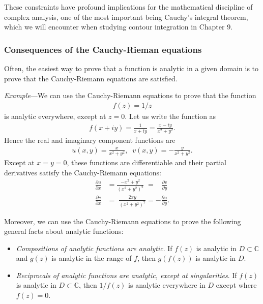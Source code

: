 \documentclass[10pt,a4paper]{article}
\begin{document}
\noindent
These constraints have profound implications for the mathematical
discipline of complex analysis, one of the most important being
Cauchy's integral theorem, which we will encounter when studying
contour integration in Chapter 9.

\subsubsection{Consequences of the Cauchy-Rieman equations}
\label{consequences-of-the-cauchy-riemann-equations}

Often, the easiest way to prove that a function is analytic in a given
domain is to prove that the Cauchy-Riemann equations are satisfied.

\begin{framed}\noindent
  \textit{Example}---We can use the Cauchy-Riemann equations to prove
  that the function
  \begin{align}
    f(z)=1/z
  \end{align}
  is analytic everywhere, except at $z = 0$.  Let us write the function as
  \begin{align}
    f(x+iy) = \frac{1}{x+iy} = \frac{x-iy}{x^2+y^2}.
  \end{align}
  Hence the real and imaginary component functions are
  \begin{align}
    u(x,y) = \frac{x}{x^2+y^2}, \;\;v(x,y) = - \frac{y}{x^2+y^2}.
  \end{align}
  Except at $x = y = 0$, these functions are differentiable and their
  partial derivatives satisfy the Cauchy-Riemann equations:
  \begin{align}
    \frac{\partial u}{\partial x} &= \frac{-x^2+y^2}{(x^2+y^2)^2} \;= \;\;\;\frac{\partial v}{\partial y} \\ \frac{\partial v}{\partial x} &= \; \frac{2xy}{(x^2+y^2)^2} = -\frac{\partial u}{\partial y}.
  \end{align}
\end{framed}

Moreover, we can use the Cauchy-Riemann equations to prove the
following general facts about analytic functions:

\begin{itemize}
\item \textit{Compositions of analytic functions are analytic}.  If
  $f(z)$ is analytic in $D \subset \mathbb{C}$ and $g(z)$ is analytic
  in the range of $f$, then $g(f(z))$ is analytic in $D$.

\item \textit{Reciprocals of analytic functions are analytic, except
  at singularities}. If $f(z)$ is analytic in $D \subset \mathbb{C}$,
  then $1/f(z)$ is analytic everywhere in $D$ except where $f(z) = 0$.
\end{itemize}
\end{document}
